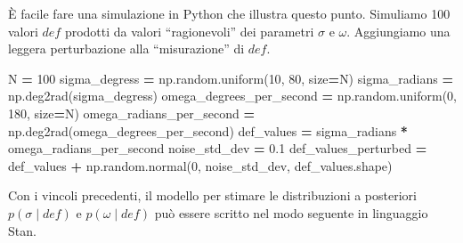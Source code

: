 \documentclass[
  man]{apa6}
\newenvironment{Shaded}{\begin{snugshade}}{\end{snugshade}}
\newcommand{\DecValTok}[1]{\textcolor[rgb]{0.00,0.00,0.81}{#1}}
\newcommand{\FloatTok}[1]{\textcolor[rgb]{0.00,0.00,0.81}{#1}}
\newcommand{\NormalTok}[1]{#1}
\newcommand{\OperatorTok}[1]{\textcolor[rgb]{0.81,0.36,0.00}{\textbf{#1}}}
\begin{document}
È facile fare una simulazione in Python che illustra questo punto. Simuliamo 100 valori \(def\) prodotti da valori ``ragionevoli'' dei parametri \(\sigma\) e \(\omega\). Aggiungiamo una leggera perturbazione alla ``misurazione'' di \(def\).

\begin{Shaded}
\begin{Highlighting}[]
\NormalTok{N }\OperatorTok{=} \DecValTok{100}
\NormalTok{sigma\_degress }\OperatorTok{=}\NormalTok{ np.random.uniform(}\DecValTok{10}\NormalTok{, }\DecValTok{80}\NormalTok{, size}\OperatorTok{=}\NormalTok{N)}
\NormalTok{sigma\_radians }\OperatorTok{=}\NormalTok{ np.deg2rad(sigma\_degress)}
\NormalTok{omega\_degrees\_per\_second }\OperatorTok{=}\NormalTok{ np.random.uniform(}\DecValTok{0}\NormalTok{, }\DecValTok{180}\NormalTok{, size}\OperatorTok{=}\NormalTok{N)}
\NormalTok{omega\_radians\_per\_second }\OperatorTok{=}\NormalTok{ np.deg2rad(omega\_degrees\_per\_second)}
\NormalTok{def\_values }\OperatorTok{=}\NormalTok{ sigma\_radians }\OperatorTok{*}\NormalTok{ omega\_radians\_per\_second}
\NormalTok{noise\_std\_dev }\OperatorTok{=} \FloatTok{0.1}
\NormalTok{def\_values\_perturbed }\OperatorTok{=}\NormalTok{ def\_values }\OperatorTok{+}\NormalTok{ np.random.normal(}\DecValTok{0}\NormalTok{, noise\_std\_dev, def\_values.shape)}
\end{Highlighting}
\end{Shaded}

Con i vincoli precedenti, il modello per stimare le distribuzioni a posteriori \(p(\sigma \mid def)\) e \(p(\omega \mid def)\) può essere scritto nel modo seguente in linguaggio Stan.
\end{document}
